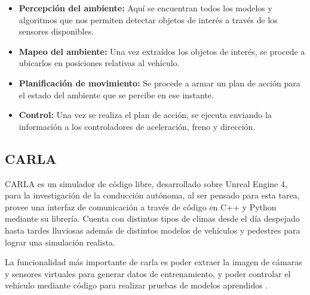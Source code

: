     \begin{itemize}[nosep]
        \item \textbf{Percepción del ambiente:} Aquí se encuentran todos los modelos y algoritmos que nos permiten detectar objetos de interés a través de los sensores disponibles.
        \item \textbf{Mapeo del ambiente:} Una vez extraídos los objetos de interés, se procede a ubicarlos en posiciones relativas al vehículo.
        \item \textbf{Planificación de movimiento:} Se procede a armar un plan de acción para el estado del ambiente que se percibe en ese instante.
        \item \textbf{Control:} Una vez se realiza el plan de acción, se ejecuta enviando la información a los controladores de aceleración, freno y dirección.
    \end{itemize}
	
	\subsection{CARLA}
		CARLA es un simulador de código libre, desarrollado sobre Unreal Engine 4, para la investigación de la conducción autónoma, al ser pensado para esta tarea, provee una interfaz de comunicación a través de código en C++ y Python mediante su librería. Cuenta con distintos tipos de climas desde el día despejado hasta tardes lluviosas además de distintos modelos de vehículos y pedestres para lograr una simulación realista.
		
		La funcionalidad más importante de carla es poder extraer la imagen de cámaras y sensores virtuales para generar datos de entrenamiento, y poder controlar el vehículo mediante código para realizar pruebas de modelos aprendidos \citep{Dosovitskiy17}.
		

